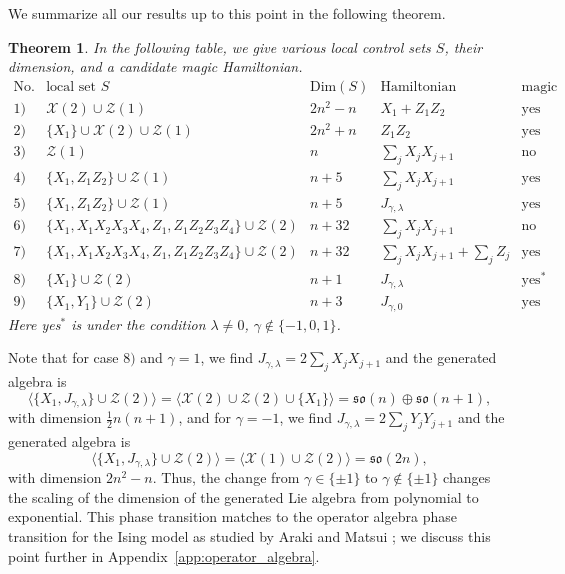 \documentclass[12pt, a4-paper]{amsart}
\newcommand{\cX}{\mathcal{X}}
\newcommand{\cZ}{\mathcal{Z}}
\newcommand{\mf}[1]{\mathfrak{#1}}
\numberwithin{equation}{section}
\newcommand{\la}{\lambda}
\newtheorem{theorem}[lemma]{Theorem}
\begin{document}
We summarize all our results up to this point in the following theorem.
\begin{theorem}\label{themagic}
In the following table, we give various local control sets $S$, their dimension, and a candidate magic Hamiltonian.
 \[ \begin{array}{c|c|c|c|c}
 \text{No.}& \text{local set } S & \text{Dim}(S) & \text{Hamiltonian} & \text{magic} \\  \hline
 1)& \mathcal{X}(2)\cup \mathcal{Z}(1)& 2n^2-n& X_1+Z_{1}Z_2 & \text{yes}  \\ 
 2)& \{X_1\}\cup \mathcal{X}(2)\cup \mathcal{Z}(1) & 2n^2+n & Z_1Z_2 & \text{yes} \\ 
 3)& \mathcal{Z}(1)  & n & \sum_j X_jX_{j+1} &  \text{no}\\
  4)&\{X_1,Z_1Z_2\}\cup \mathcal{Z}(1) & n+5 & \sum_j X_jX_{j+1} &  \text{yes}\\
  5)&\{X_1,Z_1Z_2\}\cup \mathcal{Z}(1) & n+5 & J_{\gamma,\lambda} &  \text{yes}\\
  6)& \{X_1,X_1X_2X_3X_4,Z_1,Z_1Z_2Z_3Z_4\} \cup \mathcal{Z}(2) & n+32 & \sum_j X_jX_{j+1} & \text{no} \\ 
  7)& \{X_1,X_1X_2X_3X_4,Z_1,Z_1Z_2Z_3Z_4\} \cup \mathcal{Z}(2) & n+32 & \sum_j X_jX_{j+1} + \sum_j Z_j& \text{yes} \\ 
  8)&\{X_1\}\cup \mathcal{Z}(2)  & n+1 & J_{\gamma,\lambda} & \text{yes}^* \\ 
 9)& \{X_1,Y_1\} \cup \mathcal{Z}(2) & n+3 & J_{\gamma,0} & \text{yes} 
  \end{array} \] 
Here yes$^*$ is under the condition $\la\neq 0$, $\gamma\notin\{-1,0,1\}$. \label{thm:controlsets}
\end{theorem} 
Note that for case $8)$ and $\gamma =1$, we find $J_{\gamma, \lambda} = 2\sum_j X_j X_{j+1}$ and the generated algebra is
\[
\langle \{X_1, J_{\gamma, \lambda}\}\cup \cZ(2)\rangle = \langle \cX(2) \cup \cZ(2) \cup \{X_1\} \rangle = \mf{so}(n)\oplus\mf{so}(n+1),
\]
with dimension $\frac12n(n+1)$, and for $\gamma=-1$, we find $J_{\gamma, \lambda} = 2\sum_j Y_j Y_{j+1}$ and the generated algebra is
\[
\langle \{X_1, J_{\gamma, \lambda}\}\cup \cZ(2)\rangle = \langle \cX(1) \cup \cZ(2) \rangle = \mf{so}(2n),
\]
with dimension $2n^2-n$. Thus, the change from $\gamma \in \{\pm 1\}$ to $\gamma \notin \{\pm 1\}$ changes the scaling of the dimension of the generated Lie algebra from polynomial to exponential. This phase transition matches to the operator algebra phase transition for the Ising model as studied by Araki and Matsui \cite{AM};  we discuss this point further in Appendix~\ref{app:operator_algebra}.
\end{document}
